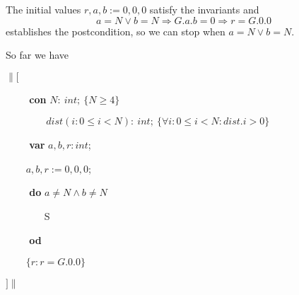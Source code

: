 \noindent The initial values $r, a, b := 0, 0, 0$ satisfy  the invariants and
\begin{equation*}
a = N \vee b = N \Rightarrow G.a.b = 0 \Rightarrow r = G.0.0
\end{equation*}
establishes the postcondition, so we can stop when $a = N \vee b = N$.

\noindent So far we have\medskip

$\|[$

\verb|    | \textbf{con} $N:\ int;\ \{N \geq 4\}$

\verb|        | $dist(i: 0 \leq i < N):\ int;\ \{\forall i: 0 \leq i < N: dist.i > 0\}$

\verb|    | \textbf{var} $a, b, r: int$;

\verb|    | $a, b, r := 0, 0, 0$;

\verb|    | \textbf{do} $a \neq N \wedge b \neq N$

\verb|       | S

\verb|    | \textbf{od}

\verb|    | $\{r: r = G.0.0 \}$

$]\|$

\medskip


